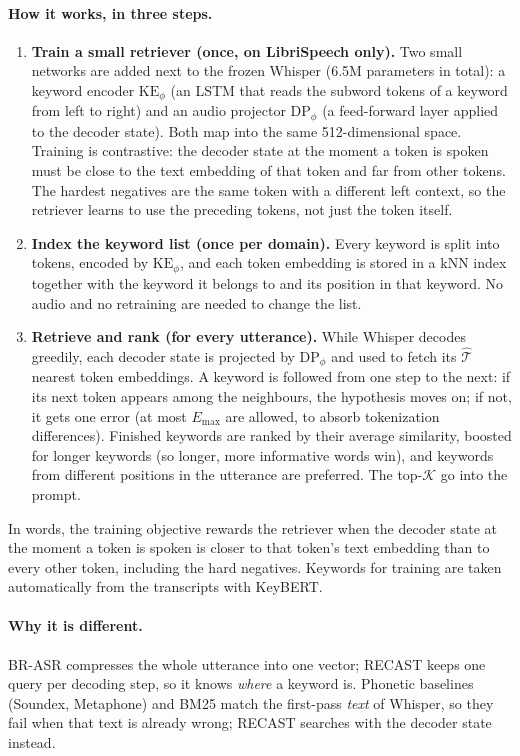 \paragraph{How it works, in three steps.}
\begin{enumerate}
  \item \textbf{Train a small retriever (once, on LibriSpeech only).}
    Two small networks are added next to the frozen Whisper (6.5M parameters in total):
    a keyword encoder $\mathrm{KE}_\phi$ (an LSTM that reads the subword tokens of a keyword from left to right)
    and an audio projector $\mathrm{DP}_\phi$ (a feed-forward layer applied to the decoder state).
    Both map into the same 512-dimensional space. Training is contrastive: the decoder state at the moment a token is spoken
    must be close to the text embedding of that token and far from other tokens.
    The hardest negatives are the same token with a different left context, so the retriever learns to use the preceding tokens, not just the token itself.
  \item \textbf{Index the keyword list (once per domain).}
    Every keyword is split into tokens, encoded by $\mathrm{KE}_\phi$, and each token embedding is stored in a kNN index together with
    the keyword it belongs to and its position in that keyword. No audio and no retraining are needed to change the list.
  \item \textbf{Retrieve and rank (for every utterance).}
    While Whisper decodes greedily, each decoder state is projected by $\mathrm{DP}_\phi$ and used to fetch its $\hat{\mathcal{T}}$ nearest token embeddings.
    A keyword is followed from one step to the next: if its next token appears among the neighbours, the hypothesis moves on; if not, it gets one error
    (at most $E_{\max}$ are allowed, to absorb tokenization differences). Finished keywords are ranked by their average similarity, boosted for longer keywords
    (so longer, more informative words win), and keywords from different positions in the utterance are preferred. The top-$\mathcal{K}$ go into the prompt.
\end{enumerate}
In words, the training objective rewards the retriever when the decoder state at the moment a token is spoken is closer to that token's text embedding
than to every other token, including the hard negatives. Keywords for training are taken automatically from the transcripts with KeyBERT.

\paragraph{Why it is different.} BR-ASR compresses the whole utterance into one vector; RECAST keeps one query per decoding step, so it knows \emph{where} a keyword is.
Phonetic baselines (Soundex, Metaphone) and BM25 match the first-pass \emph{text} of Whisper, so they fail when that text is already wrong;
RECAST searches with the decoder state instead.


